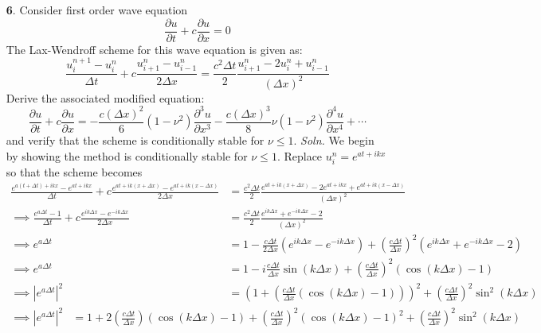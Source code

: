 \documentclass{article}
\begin{document}
\begin{itemize}
    \pagebreak



    \item[\textbf{6}.] Consider first order wave equation
    \[\frac{\partial u}{\partial t} + c\frac{\partial u}{\partial x} = 0\]
    The Lax-Wendroff scheme for this wave equation is given as:
    \[\frac{u^{n+1}_i - u^n_i}{\Delta t} + c\frac{u_{i+1}^n - u_{i-1}^n}{2\Delta x} = \frac{c^2\Delta t}{2}\frac{u_{i+1}^n - 2u_i^n + u_{i-1}^n}{(\Delta x)^2}\]
    Derive the associated modified equation:
    \[\frac{\partial u}{\partial t} + c\frac{\partial u}{\partial x} = -\frac{c(\Delta x)^2}{6}(1 - \nu^2)\frac{\partial^3u}{\partial x^3} - \frac{c(\Delta x)^3}{8}\nu(1 - \nu^2)\frac{\partial^4u}{\partial x^4} + \cdots\]
    and verify that the scheme is conditionally stable for $\nu \leq 1$.
    \newline\newline
    \textit{Soln.} We begin by showing the method is conditionally stable for $\nu \leq 1$. Replace $u_i^n = e^{at + ikx}$ so that the scheme becomes
    \begin{align*}
        \frac{e^{a(t + \Delta t) + ikx} - e^{at + ikx}}{\Delta t} + c\frac{e^{at + ik(x + \Delta x)} - e^{at + ik(x - \Delta x)}}{2\Delta x} &= \frac{c^2\Delta t}{2}\frac{e^{at + ik(x + \Delta x)} - 2e^{at + ikx} + e^{at + ik(x - \Delta x)}}{(\Delta x)^2}\\
        \implies \frac{e^{a\Delta t} - 1}{\Delta t} + c\frac{e^{ik\Delta x} - e^{-ik\Delta x}}{2\Delta x} &= \frac{c^2\Delta t}{2}\frac{e^{ik\Delta x} + e^{-ik\Delta x} - 2}{(\Delta x)^2}\\
        \implies e^{a\Delta t} &= 1 - \frac{c\Delta t}{2\Delta x}\left(e^{ik\Delta x} - e^{-ik\Delta x}\right) + \left(\frac{c\Delta t}{\Delta x}\right)^2\left(e^{ik\Delta x} + e^{-ik\Delta x} - 2\right)\\
        \implies e^{a\Delta t} &= 1 - i\frac{c\Delta t}{\Delta x}\sin(k\Delta x) + \left(\frac{c\Delta t}{\Delta x}\right)^2(\cos(k\Delta x) - 1)\\
        \implies \left|e^{a\Delta t}\right|^2 &= \left(1 + \left(\frac{c\Delta t}{\Delta x}(\cos(k\Delta x) - 1)\right)\right)^2 + \left(\frac{c\Delta t}{\Delta x}\right)^2\sin^2(k\Delta x)
    \end{align*}
    \begin{align*}
        \implies \left|e^{a\Delta t}\right|^2 &= 1 + 2\left(\frac{c\Delta t}{\Delta x}\right)(\cos(k\Delta x) - 1) + \left(\frac{c\Delta t}{\Delta x}\right)^2(\cos(k\Delta x) - 1)^2 + \left(\frac{c\Delta t}{\Delta x}\right)^2\sin^2(k\Delta x)\\

\end{align*}
\end{itemize}
\end{document}
